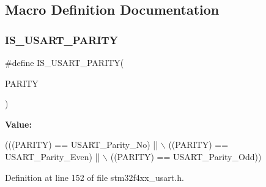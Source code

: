 \subsection{Macro Definition Documentation}
\mbox{\label{group___u_s_a_r_t___parity_gaa87b2e338e0ccc42887d3c56901bee87}} 
\subsubsection{\texorpdfstring{I\+S\+\_\+\+U\+S\+A\+R\+T\+\_\+\+P\+A\+R\+I\+TY}{IS\_USART\_PARITY}}
{\footnotesize\ttfamily \#define I\+S\+\_\+\+U\+S\+A\+R\+T\+\_\+\+P\+A\+R\+I\+TY(\begin{DoxyParamCaption}\item[{}]{P\+A\+R\+I\+TY }\end{DoxyParamCaption})}

{\bfseries Value\+:}
\begin{DoxyCode}
(((PARITY) == USART\_Parity\_No) || \(\backslash\)
                                 ((PARITY) == USART\_Parity\_Even) || \(\backslash\)
                                 ((PARITY) == USART\_Parity\_Odd))
\end{DoxyCode}


Definition at line 152 of file stm32f4xx\+\_\+usart.\+h.

